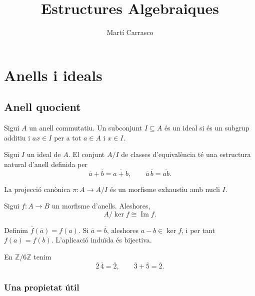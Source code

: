 \documentclass[a4paper]{article}
\title{Estructures Algebraiques}
\author{Martí Carrasco}
\date{}
\begin{document}
\maketitle
\tableofcontents
\indexresultats
\clearpage

\section{Anells i ideals}
\subsection{Anell quocient}

\begin{definicio}[Ideal]
Sigui $A$ un anell commutatiu. Un subconjunt $I\subseteq A$
és un ideal si és un subgrup additiu i $ax\in I$ per a tot
$a\in A$ i $x\in I$.
\end{definicio}

\begin{definicio}
Sigui $I$ un ideal de $A$. El conjunt $A/I$ de classes
d'equivalència té una estructura natural d'anell definida per
\[
\overline a+\overline b=\overline{a+b},\qquad
\overline a\,\overline b=\overline{ab}.
\]
\end{definicio}

\begin{obs}[][separat]
La projecció canònica $\pi:A\to A/I$ és un morfisme
exhaustiu amb nucli $I$.
\end{obs}

\begin{teo}
Sigui $f:A\to B$ un morfisme d'anells. Aleshores,
\[
A/\ker f\cong\operatorname{Im} f.
\]
\begin{dem}
Definim $\overline f(\overline a)=f(a)$.
Si $\overline a=\overline b$, aleshores $a-b\in\ker f$,
i per tant $f(a)=f(b)$. L'aplicació induïda és bijectiva.
\end{dem}
\end{teo}


\begin{exemple}
En $\mathbb Z/6\mathbb Z$ tenim
\[
\overline 2\,\overline 4=\overline 2,\qquad
\overline 3+\overline 5=\overline 2.
\]
\end{exemple}

\subsubsection{Una propietat útil}
\end{document}
